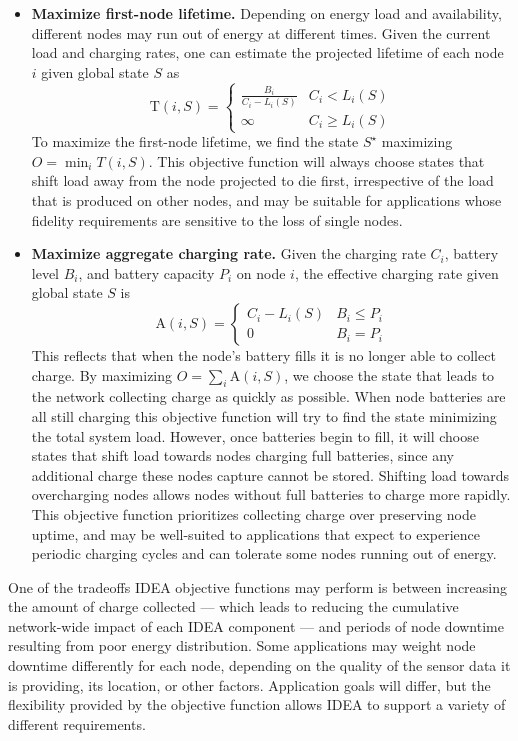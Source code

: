 \documentclass{sig-alternate}
\begin{document}
\begin{itemize}

\item \textbf{Maximize first-node lifetime.} Depending on energy load and
availability, different nodes may run out of energy at different times. Given
the current load and charging rates, one can estimate the projected lifetime
of each node $i$ given global state $S$ as \[ \mathrm{T}(i,S) = \left\{
\begin{array}{lr} \frac{B_i}{C_i - L_i(S)} & C_i < L_i(S) \\ \infty & C_i \ge
L_i(S) \end{array} \right. \] To maximize the first-node lifetime, we find
the state $S^\star$ maximizing $O = \min_{i} T(i,S)$. This objective function
will always choose states that shift load away from the node projected to die
first, irrespective of the load that is produced on other nodes, and may be
suitable for applications whose fidelity requirements are sensitive to the
loss of single nodes.

\item \textbf{Maximize aggregate charging rate.} Given the charging rate
$C_i$, battery level $B_i$, and battery capacity $P_i$ on node $i$, the
effective charging rate given global state $S$ is \[\mathrm{A}(i,S) = \left\{
\begin{array}{lr} C_i - L_i(S) & B_i \le P_i \\ 0 & B_i = P_i \end{array}
\right. \] This reflects that when the node's battery fills it is no longer
able to collect charge. By maximizing $O = \sum_{i} \mathrm{A}(i,S)$, we
choose the state that leads to the network collecting charge as quickly as
possible. When node batteries are all still charging this objective function
will try to find the state minimizing the total system load. However, once
batteries begin to fill, it will choose states that shift load towards nodes
charging full batteries, since any additional charge these nodes capture
cannot be stored. Shifting load towards overcharging nodes allows nodes
without full batteries to charge more rapidly. This objective function
prioritizes collecting charge over preserving node uptime, and may be
well-suited to applications that expect to experience periodic charging
cycles and can tolerate some nodes running out of energy.

\end{itemize}

One of the tradeoffs IDEA objective functions may perform is between
increasing the amount of charge collected --- which leads to reducing the
cumulative network-wide impact of each IDEA component --- and periods of node
downtime resulting from poor energy distribution. Some applications may
weight node downtime differently for each node, depending on the quality of
the sensor data it is providing, its location, or other factors. Application
goals will differ, but the flexibility provided by the objective function
allows IDEA to support a variety of different requirements.
\end{document}
